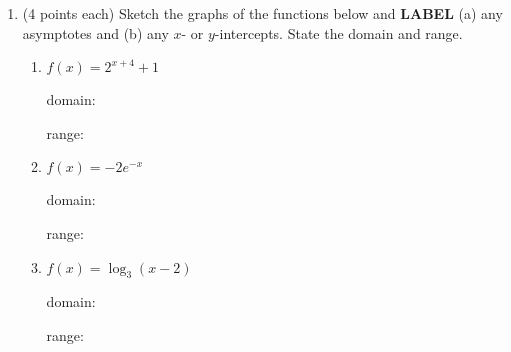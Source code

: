 \documentclass[11pt]{article}
\begin{document}
\newpage
\restoregeometry
\begin{enumerate}
\item (4 points each) Sketch the graphs of the functions below and {\bf{LABEL}} (a) any asymptotes and (b) any $x$- or $y$-intercepts. State the domain and range. 
\begin{enumerate}


\item $f(x)=2^{x+4}+1$ \begin{flushright}{domain: \underline{\hspace{2in}}}\end{flushright}
\begin{flushright}{range: \underline{\hspace{2in}}}\end{flushright}
\vspace{-.6in}


\item $f(x)=-2e^{-x}$\begin{flushright}{domain: \underline{\hspace{2in}}}\end{flushright}
\begin{flushright}{range: \underline{\hspace{2in}}}\end{flushright}
\vspace{-.6in}
\item $f(x)=\log_3 (x-2)$\begin{flushright}{domain: \underline{\hspace{2in}}}\end{flushright}
\begin{flushright}{range: \underline{\hspace{2in}}}\end{flushright}
\vspace{-.6in}
\end{enumerate}
\newpage


\end{enumerate}
\end{document}
